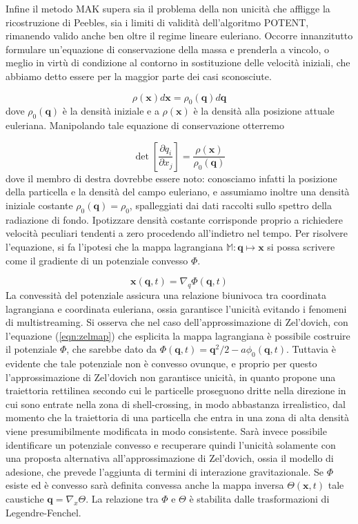 Infine il metodo MAK supera sia il problema della non unicità che affligge la ricostruzione di Peebles, 
sia i limiti di validità dell'algoritmo POTENT, rimanendo valido anche ben oltre il regime lineare euleriano.
Occorre innanzitutto formulare un'equazione di conservazione della massa e prenderla a vincolo, o meglio in virtù
di condizione al contorno in sostituzione delle velocità iniziali, che abbiamo detto essere per la maggior parte dei
casi sconosciute.

\begin{equation}
    \rho(\bm{x})d\bm{x} = \rho_0(\bm{q})d\bm{q}
\end{equation}
dove $\rho_0(\bm{q})$ è la densità iniziale e a $\rho(\bm{x})$ è la densità alla posizione attuale euleriana.
Manipolando tale equazione di conservazione otterremo 

\begin{equation}
    \label{eqn:masscons}
    \det\left[\frac{\partial q_i}{\partial x_j}\right] = \frac{\rho(\bm{x})}{\rho_0(\bm{q})}
\end{equation}
dove il membro di destra dovrebbe essere noto: conosciamo infatti la posizione della particella
e la densità del campo euleriano, e assumiamo inoltre una densità iniziale costante $\rho_0(\bm{q}) = \rho_0$,
spalleggiati dai dati raccolti sullo spettro della radiazione di fondo. Ipotizzare densità costante corrisponde 
proprio a richiedere velocità peculiari tendenti a zero procedendo all'indietro nel tempo.
Per risolvere l'equazione, si fa l'ipotesi che la mappa lagrangiana $\mathbb{M}: \bm{q} \mapsto \bm{x}$ si 
possa scrivere come il gradiente di un potenziale convesso $\Phi$.

\begin{equation}
    \bm{x}(\bm{q}, t) = \nabla_q \Phi(\bm{q}, t)
\end{equation}
La convessità del potenziale assicura una relazione biunivoca tra coordinata lagrangiana e coordinata
euleriana, ossia garantisce l'unicità evitando i fenomeni di multistreaming.
Si osserva che nel caso dell'approssimazione di Zel'dovich, con l'equazione (\ref{eqn:zelmap}) che esplicita la 
mappa lagrangiana è possibile costruire il potenziale $\Phi$, che sarebbe dato da 
$\Phi(\bm{q}, t) = \bm{q}^2/2 -a\phi_0(\bm{q}, t)$.
Tuttavia è evidente che tale potenziale non è convesso ovunque, e proprio per questo l'approssimazione
di Zel'dovich non garantisce unicità, in quanto propone una traiettoria rettilinea secondo cui le particelle 
proseguono dritte nella direzione in cui sono entrate nella zona di shell-crossing, in modo abbastanza irrealistico,
dal momento che la traiettoria di una particella che entra in una zona di alta densità viene presumibilmente modificata in modo 
consistente. 
Sarà invece possibile identificare un potenziale convesso e recuperare quindi l'unicità solamente con una proposta 
alternativa all'approssimazione di Zel'dovich, ossia il modello di adesione, che prevede l'aggiunta di 
termini di interazione gravitazionale.
Se $\Phi$ esiste ed è convesso sarà definita convessa anche la mappa inversa $\Theta(\bm{x}, t)$ tale caustiche
$\bm{q} = \nabla_x \Theta$. La relazione tra $\Phi$ e $\Theta$ è stabilita dalle trasformazioni di
Legendre-Fenchel.

